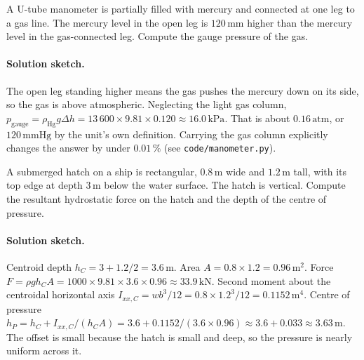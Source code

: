 \begin{exercise}
A U-tube manometer is partially filled with mercury and connected
at one leg to a gas line. The mercury level in the open leg is
$120\,\si{\milli\meter}$ higher than the mercury level in the
gas-connected leg. Compute the gauge pressure of the gas.

\paragraph{Solution sketch.} The open leg standing higher means the gas
pushes the mercury down on its side, so the gas is above atmospheric.
Neglecting the light gas column, $p_{\text{gauge}} = \rho_{\text{Hg}} g
\Delta h = 13\,600 \times 9.81 \times 0.120 \approx 16.0\,\text{kPa}$.
That is about $0.16\,\text{atm}$, or $120\,\text{mmHg}$ by the unit's
own definition. Carrying the gas column explicitly changes the answer by
under $0.01\,\%$ (see \texttt{code/manometer.py}).
\end{exercise}

\begin{exercise}
A submerged hatch on a ship is rectangular, $0.8\,\si{\meter}$
wide and $1.2\,\si{\meter}$ tall, with its top edge at depth
$3\,\si{\meter}$ below the water surface. The hatch is vertical.
Compute the resultant hydrostatic force on the hatch and the
depth of the centre of pressure.

\paragraph{Solution sketch.} Centroid depth $h_C = 3 + 1.2/2 =
3.6\,\si{\meter}$. Area $A = 0.8 \times 1.2 = 0.96\,\text{m}^2$.
Force $F = \rho g h_C A = 1000 \times 9.81 \times 3.6 \times 0.96
\approx 33.9\,\text{kN}$. Second moment about the centroidal horizontal
axis $I_{xx,C} = w b^3/12 = 0.8 \times 1.2^3 / 12 = 0.1152\,\text{m}^4$.
Centre of pressure $h_P = h_C + I_{xx,C}/(h_C A) = 3.6 + 0.1152/(3.6
\times 0.96) \approx 3.6 + 0.033 \approx 3.63\,\si{\meter}$. The offset
is small because the hatch is small and deep, so the pressure is nearly
uniform across it.
\end{exercise}

